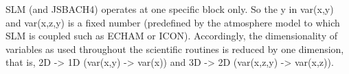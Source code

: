 SLM (and JSBACH4) operates at one specific block only. So the y in var(x,y) and var(x,z,y) is a fixed number (predefined by the atmosphere model to which SLM is coupled such as ECHAM or ICON). Accordingly, the dimensionality of variables as used throughout the scientific routines is reduced by one dimension, that is, 2D -> 1D (var(x,y) -> var(x)) and 3D -> 2D (var(x,z,y) -> var(x,z)).

